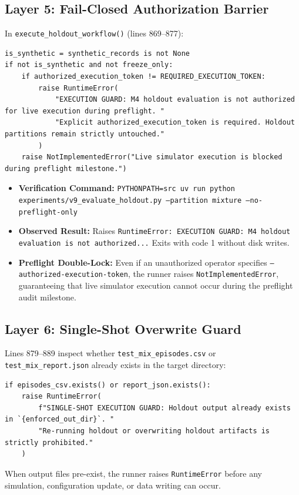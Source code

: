 \documentclass[10pt,a4paper]{article}
\begin{document}
\subsection{Layer 5: Fail-Closed Authorization Barrier}
In \texttt{execute\_holdout\_workflow()} (lines 869--877):
\begin{verbatim}
is_synthetic = synthetic_records is not None
if not is_synthetic and not freeze_only:
    if authorized_execution_token != REQUIRED_EXECUTION_TOKEN:
        raise RuntimeError(
            "EXECUTION GUARD: M4 holdout evaluation is not authorized for live execution during preflight. "
            "Explicit authorized_execution_token is required. Holdout partitions remain strictly untouched."
        )
    raise NotImplementedError("Live simulator execution is blocked during preflight milestone.")
\end{verbatim}
\begin{itemize}
    \item \textbf{Verification Command:} \texttt{PYTHONPATH=src uv run python experiments/v9\_evaluate\_holdout.py --partition mixture --no-preflight-only}
    \item \textbf{Observed Result:} Raises \texttt{RuntimeError: EXECUTION GUARD: M4 holdout evaluation is not authorized...} Exits with code 1 without disk writes.
    \item \textbf{Preflight Double-Lock:} Even if an unauthorized operator specifies \texttt{--authorized-execution-token}, the runner raises \texttt{NotImplementedError}, guaranteeing that live simulator execution cannot occur during the preflight audit milestone.
\end{itemize}

\subsection{Layer 6: Single-Shot Overwrite Guard}
Lines 879--889 inspect whether \texttt{test\_mix\_episodes.csv} or \texttt{test\_mix\_report.json} already exists in the target directory:
\begin{verbatim}
if episodes_csv.exists() or report_json.exists():
    raise RuntimeError(
        f"SINGLE-SHOT EXECUTION GUARD: Holdout output already exists in `{enforced_out_dir}`. "
        "Re-running holdout or overwriting holdout artifacts is strictly prohibited."
    )
\end{verbatim}
When output files pre-exist, the runner raises \texttt{RuntimeError} before any simulation, configuration update, or data writing can occur.
\end{document}
